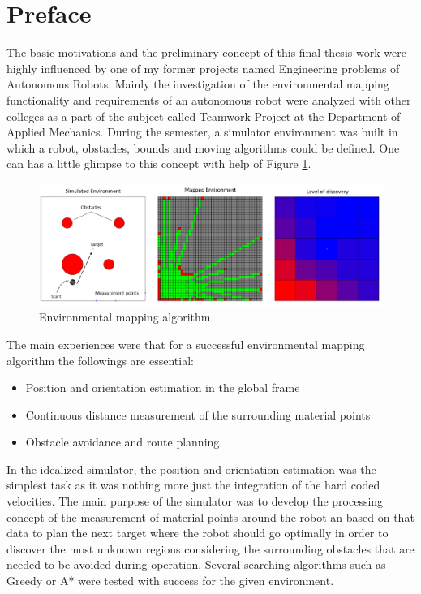 \documentclass[12pt,english,twoside]{article}
\begin{document}
\section*{Preface}
The basic motivations and the preliminary concept of this final thesis work were highly influenced by one of my former projects named Engineering problems of Autonomous Robots. Mainly the investigation of the environmental mapping functionality and requirements of an autonomous robot were analyzed with other colleges as a part of the subject called Teamwork Project at the Department of Applied Mechanics. During the semester, a simulator environment was built in which a robot, obstacles, bounds and moving algorithms could be defined. One can has a little glimpse to this concept with help of Figure \ref{glimpse}.
\begin{figure}[h]
	\centering
	\includegraphics[width=\textwidth]{figures/glimpse.png}
	\caption{Environmental mapping algorithm}
	\label{glimpse}
\end{figure}

The main experiences were that for a successful environmental mapping algorithm the followings are essential:
\begin{itemize}
	\item Position and orientation estimation in the global frame
	\item Continuous distance measurement of the surrounding material points
	\item Obstacle avoidance and route planning
\end{itemize}

In the idealized simulator, the position and orientation estimation was the simplest task as it was nothing more just the integration of the hard coded velocities. The main purpose of the simulator was to develop the processing concept of the measurement of material points around the robot an based on that data to plan the next target where the robot should go optimally in order to discover the most unknown regions considering the surrounding obstacles that are needed to be avoided during operation. Several searching algorithms such as Greedy or A* were tested with success for the given environment. 
\end{document}
